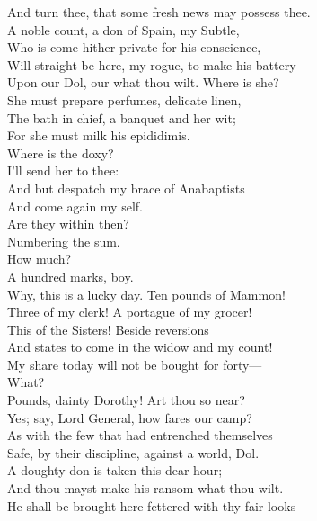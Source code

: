 \documentclass[a4paper,oneside,12pt]{memoir}
\begin{document}
\begin{drama*}
And turn thee, that some fresh news may possess thee.\\
A noble count, a don of Spain, my Subtle,\\
Who is come hither private for his conscience,\\
Will straight be here, my rogue, to make his battery\\
Upon our Dol, our what thou wilt. Where is she?\\
She must prepare perfumes, delicate linen,\\
The bath in chief, a banquet and her wit;\\
For she must milk his epididimis.\\
Where is the doxy?\\
\subtlespeaks {} I'll send her to thee:\\
And but despatch my brace of Anabaptists\\
And come again my self.\\
\facespeaks {} Are they within then?\\
\subtlespeaks Numbering the sum.\\
\facespeaks {} How much?\\
\subtlespeaks {} A hundred marks, boy.\\
\facespeaks Why, this is a lucky day. Ten pounds of Mammon!\\
Three of my clerk! A portague of my grocer!\\
This of the Sisters! Beside reversions\\
And states to come in the widow and my count!\\
My share today will not be bought for forty---\\
\dolspeaks What?\\
\facespeaks {} Pounds, dainty Dorothy! Art thou so near?\\
\dolspeaks Yes; say, Lord General, how fares our camp?\\
\facespeaks As with the few that had entrenched themselves\\
Safe, by their discipline, against a world, Dol.\\
A doughty don is taken this dear hour;\\
And thou mayst make his ransom what thou wilt.\\
He shall be brought here fettered with thy fair looks\\

\end{drama*}
\end{document}
